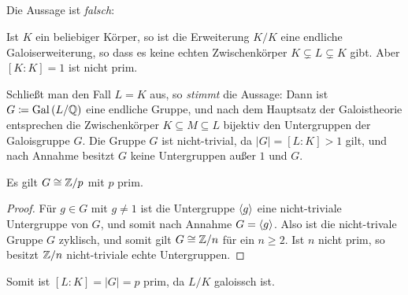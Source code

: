 \subsection{}

Die Aussage ist \emph{falsch}:

Ist $K$ ein beliebiger Körper, so ist die Erweiterung $K/K$ eine endliche Galoiserweiterung, so dass es keine echten Zwischenkörper $K \subsetneq L \subsetneq K$ gibt.
Aber $[K : K] = 1$ ist nicht prim.

\begin{remark}
  Schließt man den Fall $L = K$ aus, so \emph{stimmt} die Aussage:
  Dann ist $G \coloneqq \operatorname{Gal}{(}L/\mathbb{Q})$ eine endliche Gruppe, und nach dem Hauptsatz der Galoistheorie entsprechen die Zwischenkörper $K \subseteq M \subseteq L$ bijektiv den Untergruppen der Galoisgruppe $G$.
  Die Gruppe $G$ ist nicht-trivial, da $|G| = [L:K] > 1$ gilt, und nach Annahme besitzt $G$ keine Untergruppen außer $1$ und $G$.
  \begin{claim*}
    Es gilt $G \cong \mathbb{Z}/p$ mit $p$ prim.
  \end{claim*}
  \begin{proof}
    Für $g \in G$ mit $g \neq 1$ ist die Untergruppe $\langle g\rangle$ eine nicht-triviale Untergruppe von $G$, und somit nach Annahme $G = \langle g\rangle$.
    Also ist die nicht-trivale Gruppe $G$ zyklisch, und somit gilt $G \cong \mathbb{Z}/n$ für ein $n \geq 2$.
    Ist $n$ nicht prim, so besitzt $\mathbb{Z}/n$ nicht-triviale echte Untergruppen.
  \end{proof}
  Somit ist $[L : K] = |G| = p$ prim, da $L/K$ galoissch ist.
\end{remark}






